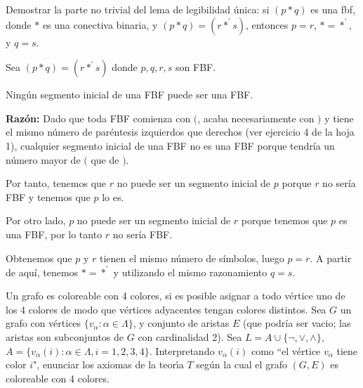 \begin{problem}[2]
Demostrar la parte no trivial del lema de legibilidad \'unica: si $(p * q)$ es una fbf, donde $*$ es una conectiva
binaria, y $(p * q) = (r *^\prime s)$, entonces $p = r$,  $*  = *^\prime$, y $q = s$.
\solution
{}

Sea $(p \ast q) = (r\ast^\prime s)$ donde $p,q,r,s$ son FBF.

Ningún segmento inicial de una FBF puede ser una FBF.

\textbf{Razón: } Dado que toda FBF comienza con $($, acaba necesariamente con $)$ y tiene el mismo número de paréntesis izquierdos que derechos (ver ejercicio 4 de la hoja 1), cualquier segmento inicial de una FBF no es una FBF porque tendría un número mayor de $($ que de $)$.

Por tanto, tenemos que $r$ no puede ser un segmento inicial de $p$ porque $r$ no sería FBF y tenemos que $p$ lo es.

Por otro lado, $p$ no puede ser un segmento inicial de $r$ porque tenemos que $p$ es una FBF, por lo tanto $r$ no sería FBF.

Obtenemos que $p$ y $r$ tienen el mismo número de símbolos, luego $p=r$. A partir de aquí, tenemos $\ast = \ast^\prime$ y utilizando el mismo razonamiento $q=s$.

\end{problem}


\begin{problem}[3]
Un grafo es coloreable con 4 colores, si es posible asignar a todo v\'ertice uno de los 4 colores de modo
que v\'ertices adyacentes tengan colores distintos. Sea $G$ un grafo con v\'ertices $\{v_\alpha : \alpha \in\Lambda\}$,
y conjunto de aristas $E$ (que podr\'ia ser vacio; las aristas son subconjuntos de $G$ con cardinalidad 2).
Sea $L =  A \cup \{\neg, \vee, \wedge \}$, $A = \{v_\alpha(i) : \alpha \in\Lambda, i = 1, 2, 3, 4\}$. Interpretando
$v_\alpha(i)$ como ``el v\'ertice $v_\alpha$ tiene color $i$", enunciar los axiomas de la teor\'{\i}a $T$ seg\'un la
cual el grafo $(G, E)$ es coloreable con 4 colores.
\solution
\end{problem}